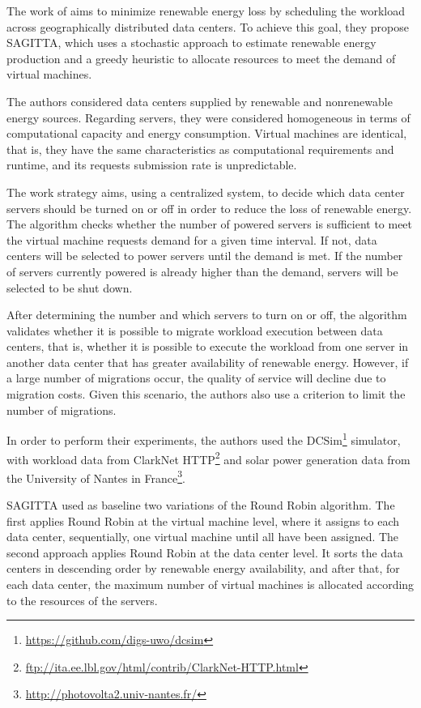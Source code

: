 \documentclass[12pt,a4paper]{article}
\begin{document}
The work of \citet{SAGITTA} aims to minimize renewable energy loss by scheduling the workload across geographically distributed data centers. To achieve this goal, they propose SAGITTA, which uses a stochastic approach to estimate renewable energy production and a greedy heuristic to allocate resources to meet the demand of virtual machines.

The authors considered data centers supplied by renewable and nonrenewable energy sources. Regarding servers, they were considered homogeneous in terms of computational capacity and energy consumption. Virtual machines are identical, that is, they have the same characteristics as computational requirements and runtime, and its requests submission rate is unpredictable.

The work strategy aims, using a centralized system, to decide which data center servers should be turned on or off in order to reduce the loss of renewable energy.  The algorithm checks whether the number of powered servers is sufficient to meet the virtual machine requests demand for a given time interval. If not, data centers will be selected to power servers until the demand is met. If the number of servers currently powered is already higher than the demand, servers will be selected to be shut down. 

After determining the number and which servers to turn on or off, the algorithm validates whether it is possible to migrate workload execution between data centers, that is, whether it is possible to execute the workload from one server in another data center that has greater availability of renewable energy. However, if a large number of migrations occur, the quality of service will decline due to migration costs. Given this scenario, the authors also use a criterion to limit the number of migrations.

In order to perform their experiments, the authors used the DCSim\footnote{\url{https://github.com/digs-uwo/dcsim}} simulator, with workload data from ClarkNet HTTP\footnote{\url{ftp://ita.ee.lbl.gov/html/contrib/ClarkNet-HTTP.html}} and solar power generation data from the University of Nantes in France\footnote{\url{http://photovolta2.univ-nantes.fr/}}.

SAGITTA \citep{SAGITTA} used as baseline two variations of the Round Robin algorithm. The first applies Round Robin at the virtual machine level, where it assigns to each data center, sequentially, one virtual machine until all have been assigned. The second approach applies Round Robin at the data center level. It sorts the data centers in descending order by renewable energy availability, and after that, for each data center, the maximum number of virtual machines is allocated according to the resources of the servers.
\end{document}

